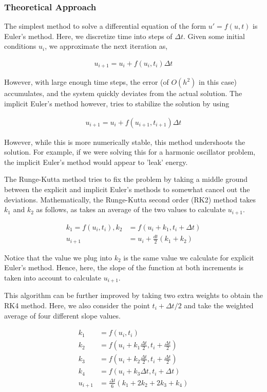 \subsubsection{Theoretical Approach}
The simplest method to solve a differential equation of the form $u' = f(u, t)$ is Euler's method. Here, we discretize time into steps of $\Delta t$. Given some initial conditions $u_i$, we approximate the next iteration as,

\begin{align}
    u_{i+1} = u_i + f(u_i, t_i)\Delta t
\end{align}

However, with large enough time steps, the error (of $O(h^2)$ in this case) accumulates, and the system quickly deviates from the actual solution. The implicit Euler's method however, tries to stabilize the solution by using

\begin{align}
    u_{i+1} = u_i + f(u_{i+1}, t_{i+1})\Delta t
\end{align}

However, while this is more numerically stable, this method undershoots the solution. For example, if we were solving this for a harmonic oscillator problem, the implicit Euler's method would appear to 'leak' energy. 

The Runge-Kutta method tries to fix the problem by taking a middle ground between the explicit and implicit Euler's methods to somewhat cancel out the deviations. Mathematically, the Runge-Kutta second order (RK2) method takes $k_1$ and $k_2$ as follows, as takes an average of the two values to calculate $u_{i+1}$.

\begin{align}
k_1 = f(u_i, t_i), k_2 &= f(u_i + k_1, t_i + \Delta t)\\
u_{i+1} &= u_i + \frac{dt}{2} (k_1+k_2)
\end{align}

Notice that the value we plug into $k_2$ is the same value we calculate for explicit Euler's method. Hence, here, the slope of the function at both increments is taken into account to calculate $u_{i+1}$.

This algorithm can be further improved by taking two extra weights to obtain the RK4 method. Here, we also consider the point $t_i + \Delta t/2$ and take the weighted average of four different slope values.

\begin{align}
    k_1 &= f(u_i, t_i) \nonumber\\
    k_2 &= f\left(u_i + k_1\frac{\Delta t}{2}, t_i+\frac{\Delta t}{2}\right) \nonumber\\
    k_3 &= f\left(u_i + k_2\frac{\Delta t}{2}, t_i+\frac{\Delta t}{2}\right) \nonumber\\
    k_4 &= f\left(u_i + k_3\Delta t, t_i+\Delta t\right) \nonumber\\
    u_{i+1} &= \frac{\Delta t}{6}(k_1+2k_2+2k_3+k_4)\nonumber\\
\end{align}

